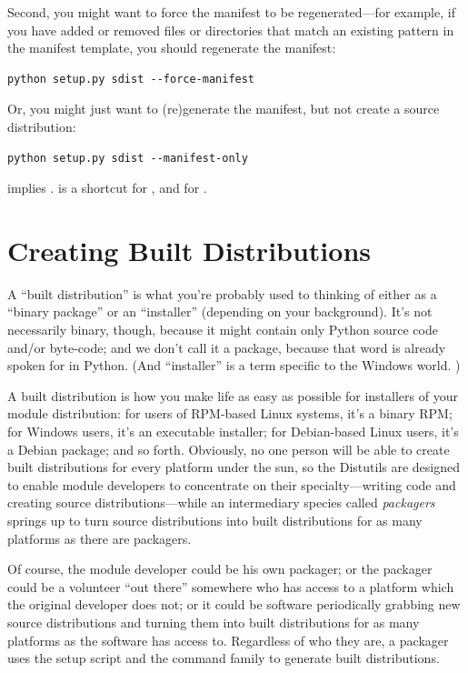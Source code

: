 \documentclass{howto}
\begin{document}
Second, you might want to force the manifest to be regenerated---for
example, if you have added or removed files or directories that match an
existing pattern in the manifest template, you should regenerate the
manifest:

\begin{verbatim}
python setup.py sdist --force-manifest
\end{verbatim}

Or, you might just want to (re)generate the manifest, but not create a
source distribution:

\begin{verbatim}
python setup.py sdist --manifest-only
\end{verbatim}

 implies .
 is a shortcut for , and
 for .


\section{Creating Built Distributions}
\label{built-dist}

A ``built distribution'' is what you're probably used to thinking of
either as a ``binary package'' or an ``installer'' (depending on your
background).  It's not necessarily binary, though, because it might
contain only Python source code and/or byte-code; and we don't call it a
package, because that word is already spoken for in Python.  (And
``installer'' is a term specific to the Windows world.  )

A built distribution is how you make life as easy as possible for
installers of your module distribution: for users of RPM-based Linux
systems, it's a binary RPM; for Windows users, it's an executable
installer; for Debian-based Linux users, it's a Debian package; and so
forth.  Obviously, no one person will be able to create built
distributions for every platform under the sun, so the Distutils are
designed to enable module developers to concentrate on their
specialty---writing code and creating source distributions---while an
intermediary species called \emph{packagers} springs up to turn source
distributions into built distributions for as many platforms as there
are packagers.

Of course, the module developer could be his own packager; or the
packager could be a volunteer ``out there'' somewhere who has access to
a platform which the original developer does not; or it could be
software periodically grabbing new source distributions and turning them
into built distributions for as many platforms as the software has
access to.  Regardless of who they are, a packager uses the
setup script and the  command family to generate built
distributions.
\end{document}
